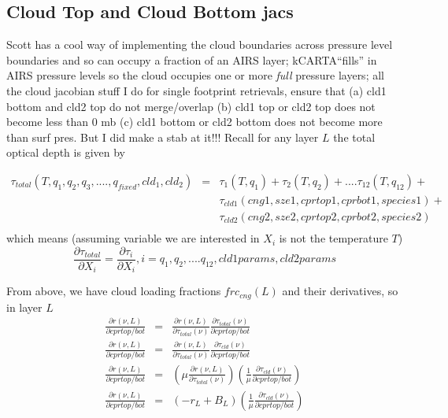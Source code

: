 \documentclass[11pt]{article}
\newcommand{\kc}{\textsf{kCARTA}\xspace}
\begin{document}
\subsection{Cloud Top and Cloud Bottom jacs}

Scott has a cool way of implementing the cloud
boundaries across pressure level boundaries and so can occupy a
fraction of an AIRS layer; \kc ``fills'' in AIRS pressure levels so
the cloud occupies one or more \textit{full} pressure layers; all the
cloud jacobian stuff I do for single footprint retrievals, ensure that
(a) cld1 bottom and cld2 top do not merge/overlap (b) cld1 top or cld2 top
does not become less than 0 mb (c) cld1 bottom or cld2 bottom does not
become more than surf pres. But I did make a stab at it!!! Recall for any layer $L$ the total optical depth is given by 

\begin{eqnarray*}
\tau_{total}(T,q_1,q_2,q_3,....,q_{fixed},cld_1,cld_2) & = & \tau_1(T,q_1) + \tau_2(T,q_2) + .... \tau_{12}(T,q_{12}) + \\
                                                       &   & \tau_{cld1}(cng1,sze1,cprtop1,cprbot1,species1) + \\
                                                       &   & \tau_{cld2}(cng2,sze2,cprtop2,cprbot2,species2) \\
\end{eqnarray*}
which means (assuming variable we are interested in $X_i$ is not the temperature $T$)
\[ 
\frac{\partial \tau_{total}}{\partial X_i} = \frac{\partial \tau_{i}}{\partial X_i}, i=q_1,q_2,....q_{12},cld1 params, cld2 params
\]

From above, we have cloud loading fractions $frc_{cng}(L)$ and their derivatives, so in layer $L$
\begin{eqnarray*}
\frac{\partial r(\nu,L)}{\partial cprtop/bot}  & = &  \frac{\partial r(\nu,L)}{\partial \tau_{total}(\nu)} \frac{\partial \tau_{total}(\nu)}{\partial cprtop/bot} \\
\frac{\partial r(\nu,L)}{\partial cprtop/bot}  & = &  \frac{\partial r(\nu,L)}{\partial \tau_{total}(\nu)} \frac{\partial \tau_{cld}(\nu)}{\partial cprtop/bot} \\
\frac{\partial r(\nu,L)}{\partial cprtop/bot}  & = &  \left( \mu \frac{\partial r(\nu,L)}{\partial \tau_{total}(\nu)} \right) \left( \frac{1}{\mu} \frac{\partial \tau_{cld}(\nu)}{\partial cprtop/bot} \right) \\
\frac{\partial r(\nu,L)}{\partial cprtop/bot}  & = &  \left( -r_L + B_L \right) \left( \frac{1}{\mu} \frac{\partial \tau_{cld}(\nu)}{\partial cprtop/bot} \right) \\
\end{eqnarray*}
\end{document}
